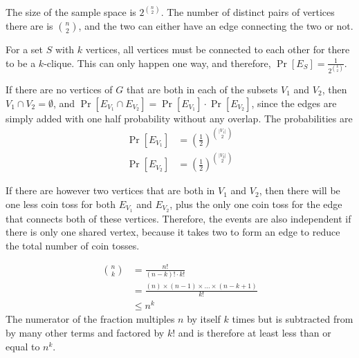 \documentclass[11pt]{article}
\begin{document}
\begin{solution}
    
\begin{Parts}
    
\Part The size of the sample space is $2^{\binom{n}{2}}$. The number of distinct 
pairs of vertices there are is $\binom{n}{2}$, and the two can either have an 
edge connecting the two or not. 

\Part For a set $S$ with $k$ vertices, all vertices must be connected to each
other for there to be a $k$-clique. This can only happen one way, and therefore,
$\Pr[E_S] = \frac{1}{2^{\binom{k}{2}}}$.

\Part If there are no vertices of $G$ that are both in each of the subsets $V_1$
and $V_2$, then $V_1 \cap V_2 = \emptyset$, and $\Pr[E_{V_1} \cap E_{V_2}] = 
\Pr[E_{V_1}] \cdot \Pr[E_{V_2}]$, since the edges are simply added with one half 
probability without any overlap. The probabilities are 
\[
    \begin{split}
        \Pr[E_{V_1}] &= \left( \frac{1}{2} \right)^{\binom{|V_1|}{2}} \\
        \Pr[E_{V_2}] &= \left( \frac{1}{2} \right)^{\binom{|V_2|}{2}}
    \end{split}
\]

If there are however two vertices that are both in $V_1$ and $V_2$, then there 
will be one less coin toss for both $E_{V_1}$ and $E_{V_2}$, plus the only one
coin toss for the edge that connects both of these vertices. Therefore, the 
events are also independent if there is only one shared vertex, because it 
takes two to form an edge to reduce the total number of coin tosses. 

\Part
\[
    \begin{split}
        \binom{n}{k} &= \frac{n!}{(n-k)! \cdot k!} \\
        &= \frac{(n) \times (n-1) \times \dots \times (n-k+1)}{k!} \\
        &\leq n^k
    \end{split}
\]
The numerator of the fraction multiples $n$ by itself $k$ times but is subtracted
from by many other terms and factored by $k!$ and is therefore at least less than 
or equal to $n^k$.


\end{Parts}
\end{solution}
\end{document}
